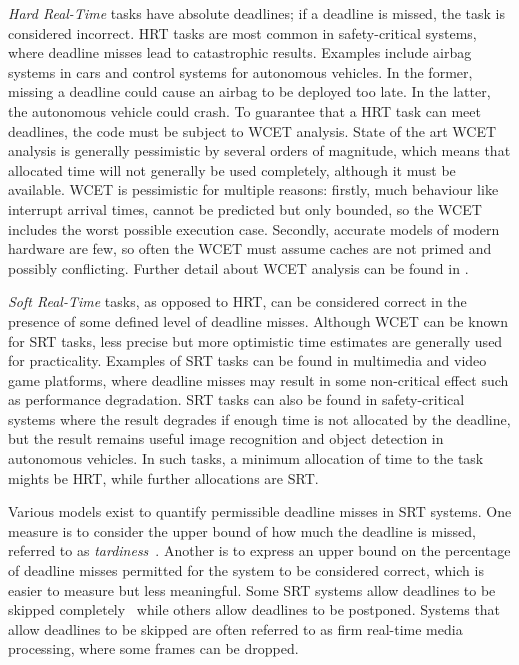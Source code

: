 \emph{Hard Real-Time} tasks have absolute deadlines; if a deadline is missed,
the task is considered incorrect. \gls{HRT} tasks are most common in safety-critical systems, where
deadline misses lead to catastrophic results.  Examples include airbag systems
in cars and control systems for autonomous vehicles.  In the former, missing a deadline could cause
an airbag to be deployed too late.  In the latter, the autonomous vehicle could crash.  To guarantee
that a \gls{HRT} task can meet deadlines, the code must be subject to {\gls{WCET}} analysis. State
of the art {\gls{WCET}} analysis is generally pessimistic by several orders of magnitude, which
means that allocated time will not generally be used completely, although it must be available.
WCET is pessimistic for multiple reasons: firstly, much behaviour like interrupt arrival times, 
cannot be predicted but only
bounded, so the WCET includes the worst possible execution case. Secondly, accurate models of modern
hardware are few, so often the WCET must assume caches are not primed and possibly conflicting. 
Further detail about {\gls{WCET}} analysis can be found in \citet{Lv_GZDYZ_09}.

\emph{Soft Real-Time} tasks, as opposed to \gls{HRT}, can be
considered correct in the presence of some defined level of deadline misses. Although {\gls{WCET}}
can be known for {\gls{SRT}} tasks, less precise but more optimistic time estimates are generally
used for practicality.  Examples of \gls{SRT} tasks can be found in multimedia and video game platforms,
where deadline misses may result in some non-critical effect such as performance degradation.
\gls{SRT} tasks can also be found in safety-critical systems where the result degrades if enough time is not
allocated by the deadline, but the result remains useful \eg image recognition and object detection
in autonomous vehicles. In such tasks, a minimum allocation of time to the task mights be \gls{HRT},
while further allocations are \gls{SRT}.

Various models exist to quantify permissible deadline misses in \gls{SRT} systems.  One measure is
to consider the upper bound of how much the deadline is missed, referred to as
\emph{tardiness}~\citep{Devi:phd}.  Another is to express an upper bound on the percentage of
deadline misses permitted for the system to be considered correct, which is easier to measure but
less meaningful. Some \gls{SRT} systems allow deadlines to be skipped
completely~\citep{Koren_Shasha_95} while others allow deadlines to be postponed. Systems that allow
deadlines to be skipped are often referred to as firm real-time \eg media processing, where some
frames can be dropped. 

